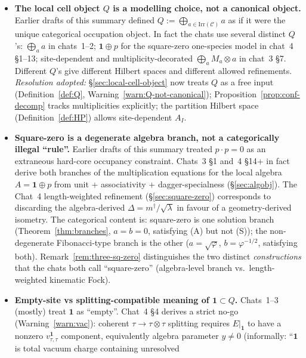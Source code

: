 \documentclass[11pt,a4paper]{article}
\theoremstyle{definition}
\newcommand{\Cc}{\mathcal{C}}
\newcommand{\Irr}{\mathrm{Irr}}
\newcommand{\one}{\mathbf{1}}
\begin{document}
\begin{itemize}[leftmargin=*]
\item \textbf{The local cell object $Q$ is a modelling choice, not a
      canonical object.} Earlier drafts of this summary defined
      $Q := \bigoplus_{a\in\Irr(\Cc)} a$ as if it were the unique
      categorical occupation object. In fact the chats use several distinct
      $Q$'s: $\bigoplus_a a$ in chats~1--2; $\one\oplus p$ for the square-zero
      one-species model in chat~4 \S1--13; site-dependent and
      multiplicity-decorated $\bigoplus_a M_a\otimes a$ in chat~3 \S7.
      Different $Q$'s give different Hilbert spaces and different allowed
      refinements. \emph{Resolution adopted:} \S\ref{sec:local-cell-object}
      now treats $Q$ as a free input (Definition~\ref{def:Q}, Warning~\ref{warn:Q-not-canonical});
      Proposition~\ref{prop:conf-decomp} tracks multiplicities explicitly;
      the partition Hilbert space (Definition~\ref{def:HP}) allows
      site-dependent $A_I$.
\item \textbf{Square-zero is a degenerate algebra branch, not a
      categorically illegal ``rule''.}
      Earlier drafts of this summary treated $p\cdot p = 0$ as an extraneous
      hard-core occupancy constraint. Chats~3 \S1 and~4 \S14+ in fact
      derive both branches of the multiplication equations for the local
      algebra $A = \one\oplus p$ from unit + associativity + dagger-specialness
      (\S\ref{sec:algobj}). The Chat~4 length-weighted refinement
      (\S\ref{sec:square-zero}) corresponds to discarding the algebra-derived
      $\Delta = m^{\dagger}/\sqrt\lambda$ in favour of a geometry-derived
      isometry. The categorical content is: square-zero is one solution
      branch (Theorem~\ref{thm:branches}, $a=b=0$, satisfying (A) but not
      (S)); the non-degenerate Fibonacci-type branch is the other
      ($a=\sqrt\varphi$, $b=\varphi^{-1/2}$, satisfying both).
      Remark~\ref{rem:three-sq-zero} distinguishes the two distinct
      \emph{constructions} that the chats both call ``square-zero''
      (algebra-level branch vs.\ length-weighted kinematic Fock).
\item \textbf{Empty-site vs splitting-compatible meaning of $\one\subset Q$.}
      Chats~1--3 (mostly) treat $\one$ as ``empty''. Chat~4 \S4 derives a
      strict no-go (Warning~\ref{warn:vac}): coherent $\tau\to\tau\otimes\tau$
      splitting requires $E|_\one$ to have a nonzero
      $v^{\one}_{\tau,\tau}$ component, equivalently algebra parameter $y\neq 0$
      (informally: ``$\one$ is total vacuum charge containing unresolved

\end{itemize}
\end{document}
